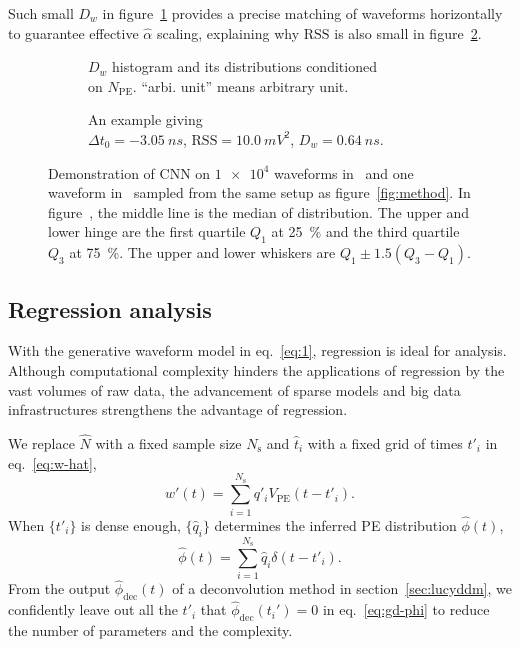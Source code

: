 Such small $D_w$ in figure~\ref{fig:cnn-npe} provides a precise matching of waveforms horizontally to guarantee effective $\hat{\alpha}$ scaling, explaining why $\mathrm{RSS}$ is also small in figure~\ref{fig:cnn}.

\begin{figure}[H]
  \begin{subfigure}{.5\textwidth}
    \centering
    \resizebox{\textwidth}{!}{}
    \caption{\label{fig:cnn-npe} $D_w$ histogram and its distributions conditioned \\ on $N_{\mathrm{PE}}$. ``arbi. unit'' means arbitrary unit.}
  \end{subfigure}
  \begin{subfigure}{.5\textwidth}
    \centering
    \resizebox{\textwidth}{!}{}
    \caption{\label{fig:cnn}An example giving \\ $\Delta t_0=\SI{-3.05}{ns}$, $\mathrm{RSS}=\SI{10.0}{mV^2}$, $D_w=\SI{0.64}{ns}$.}
  \end{subfigure}
  \caption{\label{fig:cnn-performance}Demonstration of CNN on $\num[retain-unity-mantissa=false]{1e4}$ waveforms in~ and one waveform in~ sampled from the same setup as figure~\ref{fig:method}.  In figure~, the middle line is the median of distribution. The upper and lower hinge are the first quartile $Q_1$ at \SI{25}{\percent} and the third quartile $Q_3$ at \SI{75}{\percent}. The upper and lower whiskers are $Q_1 \pm 1.5(Q_3-Q_1)$. }
\end{figure}

\subsection{Regression analysis}
\label{sec:regression}
With the generative waveform model in eq.~\eqref{eq:1}, regression is ideal for analysis. Although computational complexity hinders the applications of regression by the vast volumes of raw data, the advancement of sparse models and big data infrastructures strengthens the advantage of regression.

We replace $\hat{N}$ with a fixed sample size $N_\mathrm{s}$ and $\hat{t}_i$ with a fixed grid of times $t'_i$ in eq.~\eqref{eq:w-hat}, 
\begin{equation}
  \label{eq:gd}
  w'(t) = \sum_{i=1}^{N_\mathrm{s}}q'_iV_\mathrm{PE}(t-t'_i).
\end{equation}
When $\{t'_i\}$ is dense enough, $\{\hat{q}_i\}$ determines the inferred PE distribution $\hat{\phi}(t)$,
\begin{equation}
  \label{eq:gd-phi}
  \hat{\phi}(t) = \sum_{i=1}^{N_\mathrm{s}}\hat{q}_i\delta(t-t'_i).
\end{equation}
From the output $\hat{\phi}_\mathrm{dec}(t)$ of a deconvolution method in section~\ref{sec:lucyddm}, we confidently leave out all the $t'_i$ that $\hat{\phi}_\mathrm{dec}(t_i')=0$ in eq.~\eqref{eq:gd-phi} to reduce the number of parameters and the complexity.


